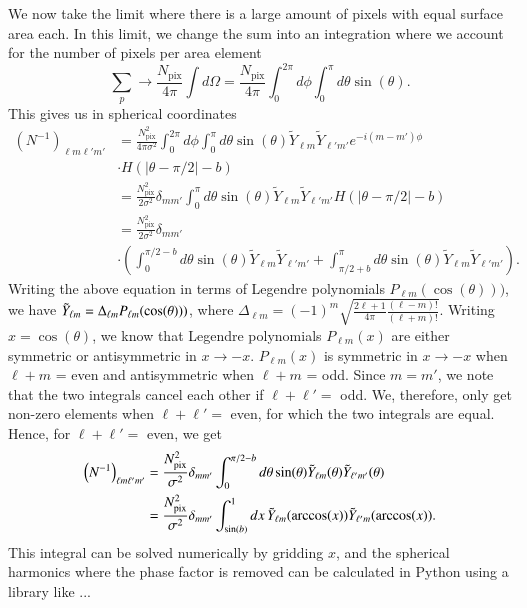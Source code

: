 \documentclass[twocolumn]{../common/aa}
\begin{document}
We now take the limit where there is a large amount of pixels with equal surface area each. In this limit, we change the sum into an integration where we account for the number of pixels per area element
\begin{equation}
\sum_p \rightarrow \frac{N_{\mathrm{pix}}}{4\pi}\int d\Omega  = \frac{N_{\mathrm{pix}}}{4\pi}\int_{0}^{2\pi} d\phi \int_{0}^{\pi} d\theta \sin(\theta).
\end{equation}
This gives us in spherical coordinates
\begin{align}
\nonumber
\left(N^{-1}\right)_{\ell m \ell' m'} &= \frac{N_{\mathrm{pix}}^2}{4\pi \sigma^2}\int_{0}^{2\pi} d\phi \int_{0}^{\pi} d\theta \sin(\theta)\tilde{Y}_{\ell m}  \tilde{Y}_{\ell' m'}  e^{-i(m-m')\phi}
\\
\nonumber
&\cdot H(|\theta -\pi/2|-b)\\
\nonumber
&= \frac{N_{\mathrm{pix}}^2}{2\sigma^2} \delta_{mm'}\int_{0}^{\pi} d\theta \sin(\theta)\tilde{Y}_{\ell m}  \tilde{Y}_{\ell' m'} H(|\theta -\pi/2|-b)\\
\nonumber
&= \frac{N_{\mathrm{pix}}^2}{2\sigma^2} \delta_{mm'}\\
&\cdot \left(\int_{0}^{\pi/2-b} d\theta \sin(\theta) \tilde{Y}_{\ell m}  \tilde{Y}_{\ell' m'}+\int_{\pi/2+b}^{\pi} d\theta \sin(\theta)\tilde{Y}_{\ell m}  \tilde{Y}_{\ell' m'}\right).
\end{align}
Writing the above equation in terms of Legendre polynomials $P_{\ell m}(\cos(\theta)))$, we have
$\Tilde{Y}_{\ell m} = \Delta_{\ell m}P_{\ell m}(\cos(\theta)))$, where ${\Delta_{\ell m}=(-1)^m \sqrt{\frac{2\ell+1}{4\pi}\frac{(\ell - m)!}{(\ell+m)!}}}$.
 Writing $x=\cos(\theta)$, we know that Legendre polynomials $P_{\ell m}(x)$ are either symmetric or antisymmetric in $x\rightarrow-x$. $P_{\ell m}(x)$ is symmetric in $x \rightarrow -x$ when $\ell+m$ = even and antisymmetric when $\ell+m$ = odd. Since $m=m'$, we note that the two integrals cancel each other if $\ell+\ell' =$ odd. We, therefore, only get non-zero elements when $\ell + \ell' =$ even, for which the two integrals are equal. Hence, for $\ell + \ell'=$ even, we get
\begin{align}
\nonumber
\left(N^{-1}\right)_{\ell m \ell' m'} &= \frac{N_{\mathrm{pix}}^2}{\sigma^2} \delta_{mm'}\int_{0}^{\pi/2-b} d\theta \sin(\theta)\Tilde{Y}_{\ell m}(\theta)\Tilde{Y}_{\ell' m'}(\theta)\\
\label{eq:finished_n_inv}
&=\frac{N_{\mathrm{pix}}^2}{\sigma^2} \delta_{mm'}\int_{\sin(b)}^{1} dx \, \Tilde{Y}_{\ell m}(\arccos(x)) \Tilde{Y}_{\ell' m}(\arccos(x)).
\end{align}
This integral can be solved numerically by gridding $x$, and the spherical harmonics where the phase factor is removed can be calculated in Python using a library like ...
\end{document}
